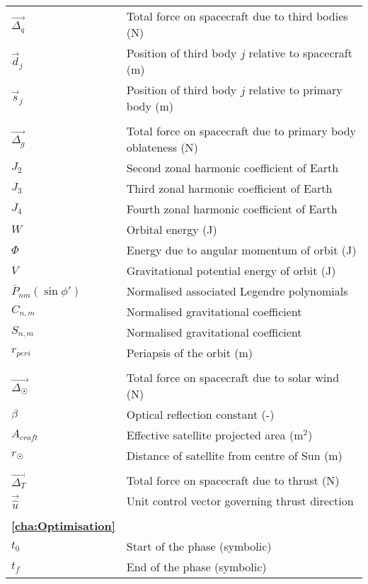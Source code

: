 \begin{longtable}{l p{}}
\\
$\vec{\Delta_q}$ & Total force on spacecraft due to third bodies (N) \\
$\vec{d}_j$ & Position of third body $j$ relative to spacecraft (m) \\
$\vec{s}_j$ & Position of third body $j$ relative to primary body (m) \\
\\
$\vec{\Delta_g}$ & Total force on spacecraft due to primary body oblateness (N) \\
$J_2$ & Second zonal harmonic coefficient of Earth\\
$J_3$ & Third zonal harmonic coefficient of Earth\\
$J_4$ & Fourth zonal harmonic coefficient of Earth\\
$W$ & Orbital energy (J) \\
$\Phi$ & Energy due to angular momentum of orbit (J) \\
$V$ & Gravitational potential energy of orbit (J) \\
$\bar{P}_{nm}\left(\sin\phi'\right)$ & Normalised associated Legendre polynomials\\
$C_{n,m}$ & Normalised gravitational coefficient \\
$S_{n,m}$ & Normalised gravitational coefficient \\
$r_{peri}$ & Periapsis of the orbit (m) \\
\\
$\vec{\Delta_\Sun}$ & Total force on spacecraft due to solar wind (N) \\
$\beta$ & Optical reflection constant (-) \\
$A_{craft}$ & Effective satellite projected area (m$^2$)\\
$r_\Sun$ & Distance of satellite from centre of Sun (m) \\
\\
$\vec{\Delta_T}$ & Total force on spacecraft due to thrust (N) \\
$\vec{\hat{u}}$ & Unit control vector governing thrust direction \\
\\
\textbf{\autoref{cha:Optimisation}}\\
$t_0$ & Start of the phase (symbolic) \\
$t_f$ & End of the phase (symbolic) \\

\end{longtable}
